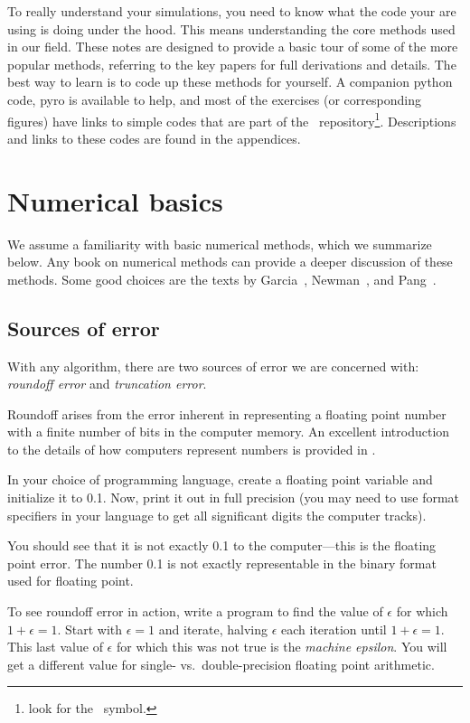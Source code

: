 To really understand your simulations, you need to know what the code
your are using is doing under the hood.  This means understanding the
core methods used in our field.  These notes are designed to provide a
basic tour of some of the more popular methods, referring to the key
papers for full derivations and details.  The best way to learn is to
code up these methods for yourself.  A companion python code, {\sf
  pyro} is available to help, and most of the exercises (or
corresponding figures) have links to simple codes that are part of the \hydroex\
repository\footnote{look for the \hydroexsymb\ symbol.}. Descriptions
and links to these codes are found in the appendices.


\section{Numerical basics}

We assume a familiarity with basic numerical methods, which we
summarize below.  Any book on numerical methods can provide a
deeper discussion of these methods.  Some good choices are the
texts by Garcia~\cite{garcia}, Newman~\cite{newman}, and Pang~\cite{pang}.

\subsection{Sources of error}

With any algorithm, there are two sources of error we are concerned
with: {\em roundoff error} and {\em truncation error}.

Roundoff arises from the error inherent in representing a floating
point number with a finite number of bits in the computer memory.  An
excellent introduction to the details of how computers represent
numbers is provided in \cite{goldberg:1991}.

\begin{exercise}
In your choice of programming language, create a floating point
variable and initialize it to 0.1.  Now, print it out in full
precision (you may need to use format specifiers in your language to
get all significant digits the computer tracks).  

You should see that it is not exactly 0.1 to the computer---this is
the floating point error.  The number 0.1 is not exactly representable
in the binary format used for floating point.
\end{exercise}


\begin{exercise}
To see roundoff error in action, write a program to find the value of
$\epsilon$ for which $1 + \epsilon = 1$.  Start with $\epsilon = 1$
and iterate, halving $\epsilon$ each iteration until $1 + \epsilon =
1$. This last value of $\epsilon$ for which this was not true is
the {\em machine epsilon}.  You will get a different value for
single- vs.\ double-precision floating point arithmetic.
\end{exercise}

